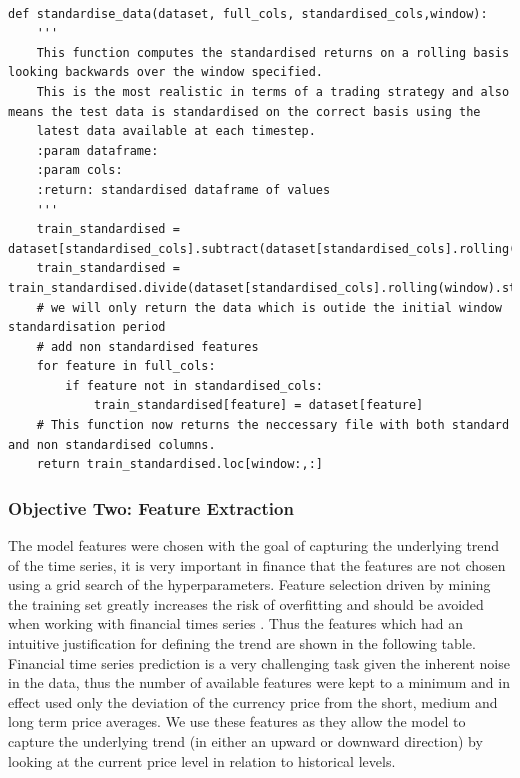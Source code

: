 \documentclass[11pt]{article}
\begin{document}
\begin{lstlisting}

def standardise_data(dataset, full_cols, standardised_cols,window):
    '''
    This function computes the standardised returns on a rolling basis looking backwards over the window specified.
    This is the most realistic in terms of a trading strategy and also means the test data is standardised on the correct basis using the
    latest data available at each timestep.
    :param dataframe:
    :param cols:
    :return: standardised dataframe of values
    '''
    train_standardised = dataset[standardised_cols].subtract(dataset[standardised_cols].rolling(window).mean())
    train_standardised = train_standardised.divide(dataset[standardised_cols].rolling(window).std())
    # we will only return the data which is outide the initial window standardisation period
    # add non standardised features
    for feature in full_cols:
        if feature not in standardised_cols:
            train_standardised[feature] = dataset[feature]
    # This function now returns the neccessary file with both standard and non standardised columns.
    return train_standardised.loc[window:,:]

\end{lstlisting}

 \subsubsection{Objective Two: Feature Extraction}
The model features  were chosen with the goal of capturing the underlying trend of the time series, it is very important in finance that the features are not chosen using a grid search of the hyperparameters. Feature selection driven by mining the training set greatly increases the risk of overfitting and should be avoided when working with financial times series \cite{Arnott2018}. Thus the features which had an intuitive justification for defining the trend are shown in the following table. Financial time series prediction is a very challenging task given the inherent noise in the data, thus the number of available features were kept to a minimum and in effect used only the deviation of the currency price from the short, medium and long term price averages. We use these features as they allow the model to capture the underlying trend (in either an upward or downward direction) by looking at the current price level in relation to historical levels.
\end{document}
